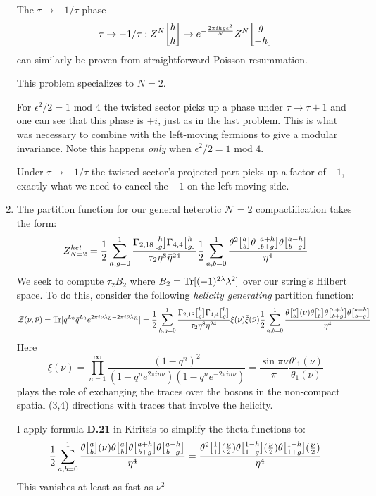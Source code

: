 \documentclass[11pt, class=article, crop=false]{standalone}
\begin{document}
\begin{enumerate}
	The $\tau \to -1/\tau$ phase
	\[
		\tau \to -1/\tau : Z^N\twist hh  \to e^{-\frac{2\pi i h g \epsilon^2}{N}} Z^N \twist{g}{-h}
	\]
	can similarly be proven from straightforward Poisson resummation. 
	
	This problem specializes to $N=2$.
	
	For $\epsilon^2/2=1 \text{ mod } 4$ the twisted sector picks up a phase under $\tau \to \tau +1$ and one can see that this phase is $+i$, just as in the last problem. This is what was necessary to combine with the left-moving fermions to give a modular invariance. Note this happens \emph{only} when $\epsilon^2/2 = 1 \text{ mod } 4$. 
	
	Under $\tau \to -1/\tau$ the twisted sector's projected part picks up a factor of $-1$, exactly what we need to cancel the $-1$ on the left-moving side.
	
	\item The partition function for our general heterotic $\mathcal N=2$ compactification takes the form:
	\[
		Z_{N=2}^{het} = \frac12 \sum_{h,g=0}^1 \frac{\Gamma_{2,18} \twist hg \Gamma_{4,4} \twist hg}{\tau_2 \eta^{8} \bar \eta^{24}} \frac12 \sum_{a,b=0}^1 \frac{\theta^2 \twist ab \theta\twist{a+h}{b+g} \theta\twist{a-h}{b-g}}{ \eta^4}
	\]
	 We seek to compute $\tau_2 B_2$ where $B_2 = \mathrm{Tr}[(-1)^{2\lambda} \lambda^2]$ over our string's Hilbert space. To do this, consider the following \emph{helicity generating} partition function:
	\begin{equation} \label{eq:helgen}
			\mathcal Z(\nu, \bar \nu) = \Tr[q^{L_0} \bar q^{\bar L_0} e^{2\pi i \nu \lambda_L - 2\pi i \bar \nu \lambda_R}] =  \frac12 \sum_{h,g=0}^1 \frac{\Gamma_{2,18} \twist hg \Gamma_{4,4} \twist hg}{\tau_2 \eta^{8} \bar \eta^{24}} \xi(\nu) \bar \xi(\bar \nu) \frac12 \sum_{a,b=0}^1 \frac{\theta\twist ab(\nu) \theta \twist ab \theta\twist{a+h}{b+g} \theta\twist{a-h}{b-g}}{ \eta^4}
	\end{equation}
	Here
	\[
		\xi(\nu) = \prod_{n=1}^\infty \frac{(1-q^n)^2}{(1-q^n e^{2\pi i n \nu}) (1-q^n e^{-2\pi i n \nu})} = \frac{\sin \pi \nu}{\pi} \frac{\theta'_1(\nu)}{\theta_1(\nu)}
	\]
	plays the role of exchanging the traces over the bosons in the non-compact spatial (3,4) directions with traces that involve the helicity. 
	
	I apply formula \textbf{D.21} in Kiritsis to simplify the theta functions to:
	\begin{equation}\label{eq:thetaid}
		\frac12 \sum_{a,b=0}^1 \frac{\theta\twist ab(\nu) \theta \twist ab \theta\twist{a+h}{b+g} \theta\twist{a-h}{b-g}}{ \eta^4} = \frac{\theta^2 \twist11 (\frac \nu2) \theta \twist{1-h}{1-g} (\frac \nu2) \theta \twist{1+h}{1+g} (\frac \nu2)}{\eta^4}
	\end{equation}
	This vanishes at least as fast as $\nu^2$
	

\end{enumerate}
\end{document}
